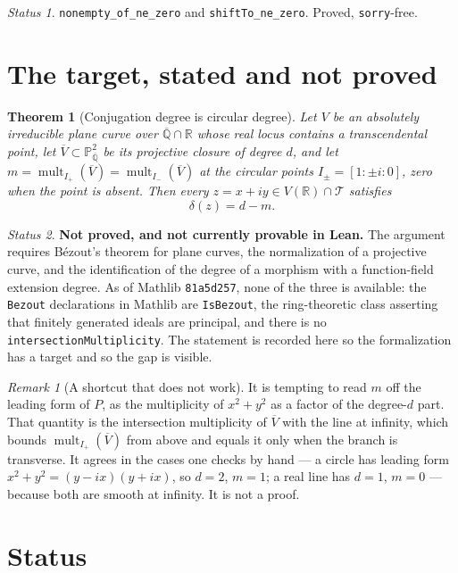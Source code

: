 \documentclass[11pt]{article}
\theoremstyle{plain}
\newtheorem{theorem}{Theorem}[section]
\theoremstyle{definition}
\theoremstyle{remark}
\newtheorem*{remark}{Remark}
\newtheorem*{status}{Status}
\newcommand{\R}{\mathbb{R}}
\newcommand{\Q}{\mathbb{Q}}
\newcommand{\Alg}{\overline{\Q}}
\newcommand{\Tc}{\mathcal{T}}
\newcommand{\lean}[1]{\textup{\texttt{#1}}}
\begin{document}
\begin{status}
\lean{nonempty\_of\_ne\_zero} and \lean{shiftTo\_ne\_zero}. Proved,
\lean{sorry}-free.
\end{status}

\section{The target, stated and not proved}

\begin{theorem}[Conjugation degree is circular degree]\label{thm:target}
Let $V$ be an absolutely irreducible plane curve over $\Alg\cap\R$ whose real
locus contains a transcendental point, let $\overline V\subset\mathbb P^2_{\Alg}$
be its projective closure of degree $d$, and let
$m=\operatorname{mult}_{I_+}(\overline V)=\operatorname{mult}_{I_-}(\overline V)$
at the circular points $I_\pm=[1:\pm i:0]$, zero when the point is absent.
Then every $z=x+iy\in V(\R)\cap\Tc$ satisfies
\[
  \delta(z)=d-m.
\]
\end{theorem}

\begin{status}
\textbf{Not proved, and not currently provable in Lean.} The argument requires
B\'ezout's theorem for plane curves, the normalization of a projective curve,
and the identification of the degree of a morphism with a function-field
extension degree. As of Mathlib \texttt{81a5d257}, none of the three is
available: the \texttt{Bezout} declarations in Mathlib are \texttt{IsBezout},
the ring-theoretic class asserting that finitely generated ideals are
principal, and there is no \texttt{intersectionMultiplicity}. The statement is
recorded here so the formalization has a target and so the gap is visible.
\end{status}

\begin{remark}[A shortcut that does not work]
It is tempting to read $m$ off the leading form of $P$, as the multiplicity of
$x^2+y^2$ as a factor of the degree-$d$ part. That quantity is the
intersection multiplicity of $\overline V$ with the line at infinity, which
bounds $\operatorname{mult}_{I_+}(\overline V)$ from above and equals it only
when the branch is transverse. It agrees in the cases one checks by hand — a
circle has leading form $x^2+y^2=(y-ix)(y+ix)$, so $d=2$, $m=1$; a real line
has $d=1$, $m=0$ — because both are smooth at infinity. It is not a proof.
\end{remark}

\section{Status}
\end{document}
